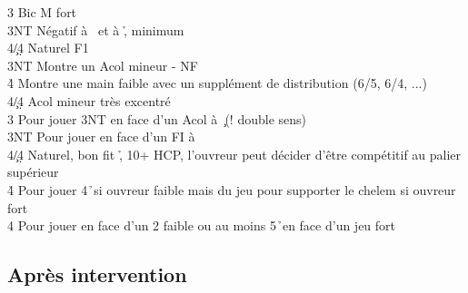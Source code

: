 \documentclass[a4paper]{article}
\begin{document}
\begin{bidtable}
3\s \> Bic M fort\+\\
3NT \> Négatif à \s\ et à \h , minimum\\
4\c/4\d \> Naturel F1\-\\
3NT \> Montre un Acol mineur - NF\\
4\h \> Montre une main faible avec un supplément de distribution (6/5, 6/4, ...)\\
4\c/4\d \> Acol mineur très excentré\-\\
3\s \> Pour jouer 3NT en face d'un Acol à \c\ (! double sens)\\
3NT \> Pour jouer en face d'un FI à \d \\
4\c/4\d \> Naturel, bon fit \h , 10+ HCP, l'ouvreur peut décider d'être compétitif au palier supérieur\\
4\h \> Pour jouer 4\h\ si ouvreur faible mais du jeu pour supporter le chelem si ouvreur fort\\
4\s \> Pour jouer en face d'un 2 faible ou au moins 5\h\ en face d'un jeu fort\-
\end{bidtable}

\subsection{Après intervention}
\end{document}
